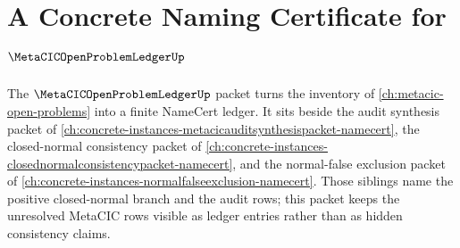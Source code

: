 \chapter{A Concrete Naming Certificate for $\MetaCICOpenProblemLedgerUp$}
\label{ch:concrete-instances-metacicopenproblemledger-namecert}

The $\MetaCICOpenProblemLedgerUp$ packet turns the inventory of \autoref{ch:metacic-open-problems} into a finite NameCert ledger. It sits beside the audit synthesis packet of \autoref{ch:concrete-instances-metacicauditsynthesispacket-namecert}, the closed-normal consistency packet of \autoref{ch:concrete-instances-closednormalconsistencypacket-namecert}, and the normal-false exclusion packet of \autoref{ch:concrete-instances-normalfalseexclusion-namecert}. Those siblings name the positive closed-normal branch and the audit rows; this packet keeps the unresolved MetaCIC rows visible as ledger entries rather than as hidden consistency claims.

